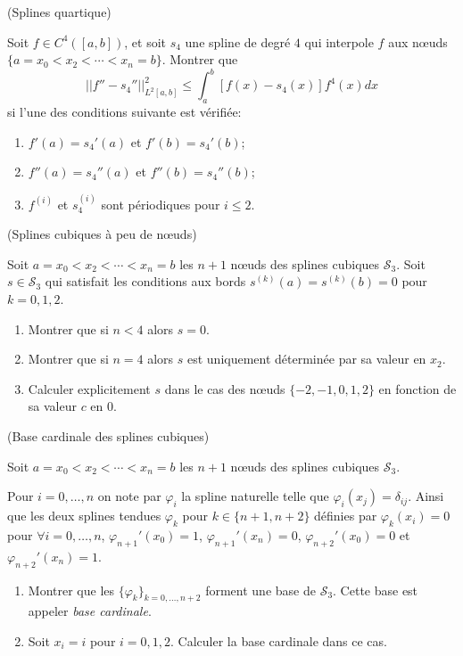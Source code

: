 \documentclass[a4paper,12pt,reqno]{amsart}
\begin{document}
\begin{exo} (Splines quartique)

  Soit $f \in C^{4}([a,b])$, et soit $s_{4}$ une spline de degré $4$ qui interpole $f$ aux nœuds $\{a=x_{0}<x_{2}<\cdots<x_{n}=b\}$. Montrer que
      $$
        ||f''-s_{4}'' ||_{L^{2}[a,b]}^{2} \leq \int_{a}^{b} [f(x)-s_{4}(x)]f^{4}(x) dx
      $$
    si l'une des conditions suivante est vérifiée:
    \begin{enumerate}
      \item $f'(a)=s_{4}'(a)$ et $f'(b)=s_{4}'(b)$;
      \item $f''(a)=s_{4}''(a)$ et $f''(b)=s_{4}''(b)$;
      \item $f^{(i)}$ et $s_{4}^{(i)}$ sont périodiques pour $i \leq 2$.
    \end{enumerate}
\end{exo}

\begin{exo} (Splines cubiques à peu de nœuds)

  Soit $a=x_{0}<x_{2}<\cdots<x_{n}=b$ les $n+1$ nœuds des splines cubiques $\mathcal{S}_{3}$. Soit $s \in \mathcal{S}_{3}$ qui satisfait les conditions aux bords $s^{(k)}(a)=s^{(k)}(b)=0$ pour $k=0,1,2$.
  \begin{enumerate}
    \item Montrer que si $n < 4$ alors $s=0$.

    \item Montrer que si $n=4$ alors $s$ est uniquement déterminée par sa valeur en $x_{2}$.

    \item Calculer explicitement $s$ dans le cas des nœuds $\{-2,-1,0,1,2\}$ en fonction de sa valeur $c$ en $0$.
  \end{enumerate}

\end{exo}

\begin{exo} (Base cardinale des splines cubiques)

  Soit $a=x_{0}<x_{2}<\cdots<x_{n}=b$ les $n+1$ nœuds des splines cubiques $\mathcal{S}_{3}$.

  Pour $i=0,\ldots,n$ on note par $\varphi_{i}$ la spline naturelle telle que $\varphi_{i}(x_{j})=\delta_{ij}$. Ainsi que les deux splines tendues $\varphi_{k}$ pour $k \in \{n+1,n+2\}$ définies par $\varphi_{k}(x_{i})=0$ pour $\forall i=0,\ldots,n$, $\varphi_{n+1}'(x_{0})=1$, $\varphi_{n+1}'(x_{n})=0$, $\varphi_{n+2}'(x_{0})=0$ et $\varphi_{n+2}'(x_{n})=1$.
  \begin{enumerate}
    \item Montrer que les $\{\varphi_{k}\}_{k=0,\ldots,n+2}$ forment une base de $\mathcal{S}_{3}$.\newline
    Cette base est appeler \emph{base cardinale}.
    \item Soit $x_{i}=i$ pour $i=0,1,2$. Calculer la base cardinale dans ce cas.
  \end{enumerate}
\end{exo}
\end{document}
